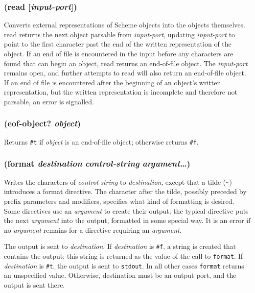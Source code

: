 \documentclass{article}
\begin{document}
\subsubsection{(read [\emph{input-port}])}

Converts external representations of Scheme objects into the objects themselves. read returns
the next object parsable from \emph{input-port}, updating \emph{input-port} to point to the
first character past the end of the written representation of the object. If an end of file is
encountered in the input before any characters are found that can begin an object, read
returns an end-of-file object. The \emph{input-port} remains open, and further attempts to
read will also return an end-of-file object. If an end of file is encountered after the
beginning of an object’s written representation, but the written representation is incomplete
and therefore not parsable, an error is signalled.

\subsubsection{(eof-object? \emph{object})}

Returns \verb|#t| if \emph{object} is an end-of-file object; otherwise returns
\verb|#f|.

\subsubsection{(format \emph{destination} \emph{control-string} \emph{argument}\ldots{})}

Writes the characters of \emph{control-string} to \emph{destination}, except that a tilde
(\verb|~|) introduces a format directive. The character after the tilde,
possibly preceded by prefix parameters and modifiers, specifies what kind of formatting is
desired. Some directives use an \emph{argument} to create their output; the typical directive
puts the next \emph{argument} into the output, formatted in some special way. It is an error
if no \emph{argument} remains for a directive requiring an \emph{argument}.

The output is sent to \emph{destination}. If \emph{destination} is \verb|#f|, a string is
created that contains the output; this string is returned as the value of the call to
\verb|format|. If \emph{destination} is \verb|#t|, the output is sent to \verb|stdout|.
In all other cases \verb|format| returns an unspecified value. Otherwise, destination must
be an output port, and the output is sent there.
\end{document}
